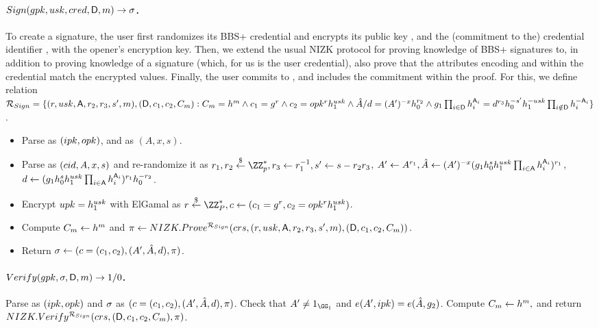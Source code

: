 \paragraph{$Sign(gpk,usk,cred,\mathsf{D},m) \rightarrow \sigma$.} %
To create a signature, the user first randomizes its BBS+ credential \cred and
encrypts its public key \upk, and the (commitment to the) credential identifier
\credid, with the opener's encryption key. Then, we extend
the usual NIZK protocol for proving knowledge of BBS+ signatures \cite{cdl16b}
to, in addition to proving knowledge of a signature (which, for us is the user
credential), also prove that the attributes encoding \credid and \usk within
the credential match the encrypted values. Finally, the user commits to \msg,
and includes the commitment within the proof. For this, we define relation
$\mathcal{R}_{Sign}= \lbrace (r,usk,\mathsf{A},r_2,r_3,s',m),(\mathsf{D},c_1,c_2,
C_{m}): C_{m} = h^m \land c_1 = g^r \land c_2 = opk^rh_1^{usk}
\land \hat{A}/d = (A')^{-x}h_0^{r_2} \land
g_1 \prod_{i \in \mathsf{D}} h_i^{\mathsf{A}_i} =
d^{r_3}h_0^{-s'}h_1^{-usk}
\prod_{i \notin \mathsf{D}} h_i^{-\mathsf{A}_i} \rbrace$.

\begin{itemize}
\item Parse \gpk as $(ipk,opk)$, and \cred as $(A,x,s)$.
\item Parse \cred as $(cid,A,x,s)$ and re-randomize it as $r_1,r_2 \getr
  \ZZ^*_p, r_3 \gets r_1^{-1}, s' \gets s - r_2r_3$, $A' \gets A^{r_1},
  \hat{A} \gets (A')^{-x}(g_1h_0^sh_1^{usk}
  \prod_{i \in \mathsf{A}}h_i^{\mathsf{A}_i})^{r_1}$,
  $d \gets (g_1h_0^sh_1^{usk}
  \prod_{i \in \mathsf{A}}h_i^{\mathsf{A}_i})^{r_1}h_0^{-r_2}$.
\item Encrypt $upk=h_1^{usk}$ with ElGamal as $r \getr \ZZ^*_P,
  c \gets (c_1 = \gen{g}^r,c_2 = \opk^r\gen{h}_1^{\usk})$.
\item Compute $C_{m} \gets h^m$ and
  $\pi \gets NIZK.Prove^{\mathcal{R}_{Sign}}(crs,
  (r,usk,\mathsf{A},r_2,r_3,s',m), (\mathsf{D},c_1,c_2,C_{m}))$.
\item Return $\sigma \gets (c=(c_1,c_2),(A',\hat{A},d),\pi)$.
\end{itemize}

\paragraph{$Verify(gpk,\sigma,\mathsf{D},m) \rightarrow 1/0$.} %
Parse \gpk as $(ipk,opk)$ and $\sigma$ as $(c=(c_1,c_2),
(A',\hat{A},d), \pi)$. Check that $A' \neq 1_{\GG_1}$ and $e(A',ipk) =
e(\hat{A},g_2)$. Compute $C_{m} \gets h^m,$ and return
$NIZK.Verify^{\mathcal{R}_{Sign}}(crs,(\mathsf{D},c_1,c_2,C_{m}),
\pi)$.

